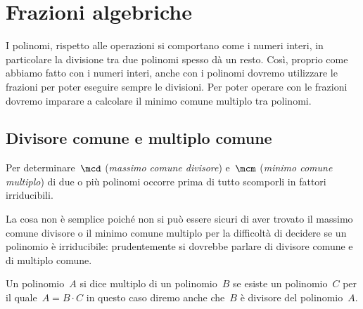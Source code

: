 


\chapter{Frazioni algebriche}

% 

I polinomi, rispetto alle operazioni si comportano come i numeri interi, 
in particolare la divisione tra due polinomi spesso dà un resto. 
Così, proprio come abbiamo fatto con i numeri interi, anche con i polinomi 
dovremo utilizzare le frazioni per poter eseguire sempre le divisioni. 
Per poter operare con le frazioni dovremo imparare a calcolare il minimo 
comune multiplo tra polinomi.

\section{Divisore comune e multiplo comune}
\label{sec:frazalg_MCDemcm}

Per determinare~\(\mcd\) (\emph{massimo comune divisore}) 
e~\(\mcm\) (\emph{minimo comune multiplo}) di due o più polinomi occorre 
prima di tutto scomporli in fattori 
irriducibili.

\begin{osservazione}{}{} 
La cosa non è semplice poiché non si può essere sicuri di aver 
trovato il massimo comune divisore o il minimo comune multiplo
per la difficoltà di decidere se un polinomio è irriducibile: 
prudentemente si dovrebbe parlare di divisore comune e di multiplo comune.
\end{osservazione}

Un polinomio~\(A\) si dice multiplo di un 
polinomio~\(B\) se 
esiste un polinomio~\(C\) per il quale~\(A=B\cdot C\) in questo caso diremo
anche che~\(B\) è divisore del polinomio~\(A\).

